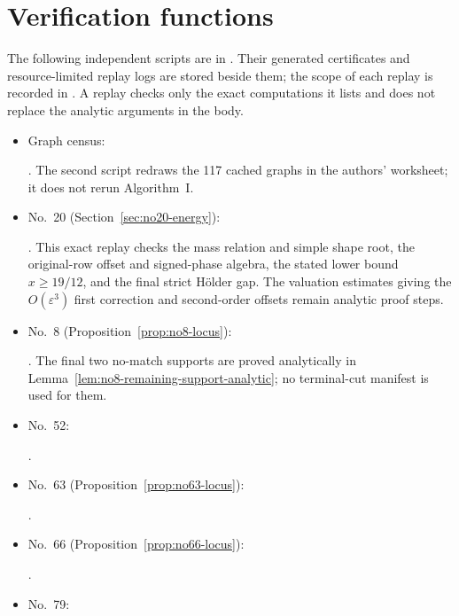\documentclass[11pt]{amsart}
\theoremstyle{remark}
\begin{document}
\section{Verification functions}\label{app:verification}
The following independent scripts are in \texttt{}. Their generated certificates and resource-limited replay logs are stored beside them; the scope of each replay is recorded in \texttt{}. A replay checks only the exact computations it lists and does not replace the analytic arguments in the body.
\begin{itemize}\footnotesize\raggedright
\setlength{\itemsep}{0pt}
\item Graph census:\par
\texttt{}\par
\texttt{}.
The second script redraws the 117 cached graphs in the authors' worksheet; it does not rerun Algorithm~I.
\item No.~20 (Section~\ref{sec:no20-energy}):\par
\texttt{}.
This exact replay checks the mass relation and simple shape root, the original-row offset and signed-phase algebra, the stated lower bound $x\ge19/12$, and the final strict H\"older gap. The valuation estimates giving the $O(\varepsilon^3)$ first correction and second-order offsets remain analytic proof steps.
\item No.~8 (Proposition~\ref{prop:no8-locus}):\par
\texttt{}.
The final two no-match supports are proved analytically in Lemma~\ref{lem:no8-remaining-support-analytic}; no terminal-cut manifest is used for them.
\item No.~52:\par
\texttt{}\par
\texttt{}.
\item No.~63 (Proposition~\ref{prop:no63-locus}):\par
\texttt{}.
\item No.~66 (Proposition~\ref{prop:no66-locus}):\par
\texttt{}.
\item No.~79:\par

\end{itemize}
\end{document}
